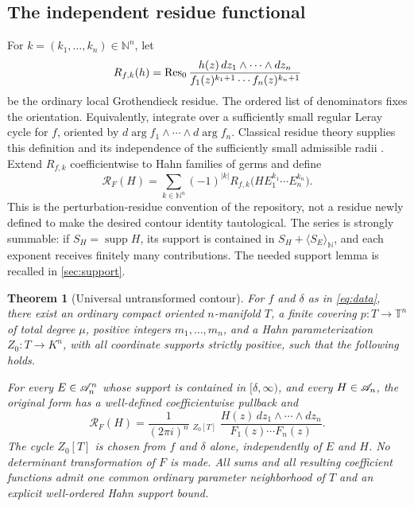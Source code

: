 \documentclass[11pt,letterpaper]{article}
\newtheorem{theorem}{Theorem}[section]
\theoremstyle{definition}
\theoremstyle{remark}
\newcommand{\N}{\mathbb N}\newcommand{\Z}{\mathbb Z}\newcommand{\Q}{\mathbb Q}
\newcommand{\supp}{\operatorname{supp}}\newcommand{\CT}{\operatorname{CT}}
\newcommand{\HInt}{\mathop{\int^{\!H}}\nolimits}
\newcommand{\T}{\mathbb T}\newcommand{\D}{\mathbb D}
\newcommand{\powers}[1]{\langle #1\rangle_{\N}}
\numberwithin{equation}{section}
\begin{document}
\subsection{The independent residue functional}
For $k=(k_1,\ldots,k_n)\in\N^n$, let
\begin{equation}\label{eq:Rk}
 R_{f,k}(h)=\operatorname{Res}_0
 \frac{h(z)\,dz_1\wedge\cdots\wedge dz_n}
 {f_1(z)^{k_1+1}\cdots f_n(z)^{k_n+1}}
\end{equation}
be the ordinary local Grothendieck residue. The ordered list of denominators
fixes the orientation. Equivalently, integrate over a sufficiently small
regular Leray cycle for $f$, oriented by
$d\arg f_1\wedge\cdots\wedge d\arg f_n$.
Classical residue theory supplies this definition and its independence of the
sufficiently small admissible radii \cite{GH,TN}.
Extend $R_{f,k}$ coefficientwise to Hahn families of germs and define
\begin{equation}\label{eq:residue}
 \mathcal R_F(H)
 =\sum_{k\in\N^n}(-1)^{|k|}
 R_{f,k}\bigl(H E_1^{k_1}\cdots E_n^{k_n}\bigr).
\end{equation}
This is the perturbation-residue convention of the repository, not a residue
newly defined to make the desired contour identity tautological. The series is
strongly summable: if $S_H=\supp H$, its support is contained in
$S_H+\powers{S_E}$, and each exponent receives finitely many contributions.
The needed support lemma is recalled in \cref{sec:support}.

\begin{theorem}[Universal untransformed contour]\label{thm:main}
For $f$ and $\delta$ as in \eqref{eq:data}, there exist an ordinary compact
oriented $n$-manifold $T$, a finite covering
$p:T\to\T^n$ of total degree $\mu$, positive integers $m_1,\ldots,m_n$, and
a Hahn parameterization $Z_0:T\to K^n$, with all coordinate supports strictly
positive, such that the following holds.

For every $E\in\mathscr A_n^n$ whose support is contained in $[\delta,\infty)$,
and every $H\in\mathscr A_n$, the original form has a well-defined coefficientwise
pullback and
\begin{equation}\label{eq:main}
 \boxed{\quad
 \mathcal R_F(H)=\frac{1}{(2\pi i)^n}
 \HInt_{Z_0[T]}
 \frac{H(z)\,dz_1\wedge\cdots\wedge dz_n}{F_1(z)\cdots F_n(z)}.
 \quad}
\end{equation}
The cycle $Z_0[T]$ is chosen from $f$ and $\delta$ alone, independently of
$E$ and $H$. No determinant transformation of $F$ is made.
All sums and all resulting coefficient functions admit one common ordinary
parameter neighborhood of $T$ and an explicit well-ordered Hahn support bound.
\end{theorem}
\end{document}
